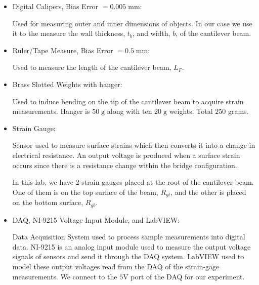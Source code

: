 \documentclass{article}
\begin{document}
\begin{itemize}
\item Digital Calipers, Bias Error $= 0.005\; \text{mm}$: 
\vspace{1mm}

Used for measuring outer and inner dimensions of objects. In our case we use it to the measure the wall thickness, $t_{b}$, and width, $b$, of the cantilever beam.
\vspace{2.5mm}

\item Ruler/Tape Measure, Bias Error $= 0.5\; \text{mm}$: 
\vspace{1mm}

Used to measure the length of the cantilever beam, $L_{F}$.
\vspace{2.5mm}

\item Brass Slotted Weights with hanger: 
\vspace{1mm}

Used to induce bending on the tip of the cantilever beam to acquire strain measurements. Hanger is $50\; \text{g}$ along with ten $20\; \text{g}$ weights. Total $250$ grams. 
\vspace{2.5mm}

\item Strain Gauge: 
\vspace{1mm}

Sensor used to measure surface strains which then converts it into a change in electrical resistance. An output voltage is produced when a surface strain occurs since there is a resistance change within the bridge configuration.
\vspace{1mm}

In this lab, we have 2 strain gauges placed at the root of the cantilever beam. One of them is on the top surface of the beam, $R_{g t}$, and the other is placed on the bottom surface, $R_{g b}$.
\vspace{2.5mm}

\item DAQ, NI-9215 Voltage Input Module, and LabVIEW:
\vspace{1mm}

Data Acquisition System used to process sample measurements into digital data. NI-9215 is an analog input module used to measure the output voltage signals of sensors and send it through the DAQ system. LabVIEW used to model these output voltages read from the DAQ of the strain-gage measurements. We connect to the $5 \text{V}$ port of the DAQ for our experiment.
\vspace{2.5mm}


\end{itemize}
\end{document}
